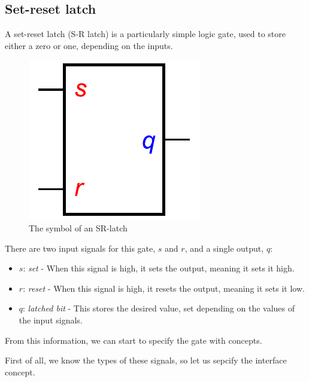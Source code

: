 \documentclass[british, journal]{IEEEtran}
\begin{document}
\subsection{Set-reset latch \label{sub:srlatch}}

A set-reset latch (S-R latch) is a particularly simple logic gate, used to store either a zero or one,
depending on the inputs. 

\begin{figure}[h]
\begin{centering}
\includegraphics[scale=0.51]{Images/sr-latch-circuit}
\par\end{centering}
\vspace{-1mm}
\protect\caption{\label{fig:sr-latch-circuit} The symbol of an SR-latch}
\vspace{-5mm}
\end{figure}

\noindent There are two input signals for this gate, $s$ and $r$, and a single output, $q$: 

\begin{itemize}
  \item $s$: \emph{set} - When this signal is high, it sets the output, meaning it sets it high.
  \item $r$: \emph{reset} - When this signal is high, it resets the output, meaning it sets it low.
  \item $q$: \emph{latched bit} - This stores the desired value, set depending on the values of the input signals.
\end{itemize}

\noindent From this information, we can start to specify the gate with concepts.

First of all, we know the types of these signals, so let us sepcify the interface concept.
\end{document}
